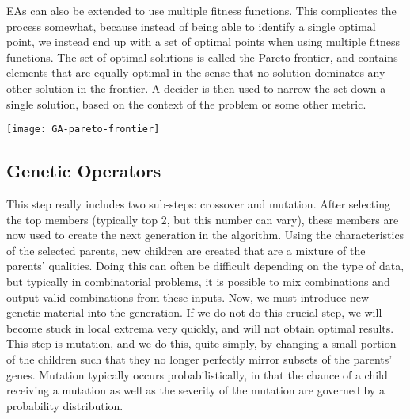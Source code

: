 EAs can also be extended to use multiple fitness functions. This complicates the process somewhat, because instead of being able to identify a single optimal point, we instead end up with a set of optimal points when using multiple fitness functions. The set of optimal solutions is called the Pareto frontier, and contains elements that are equally optimal in the sense that no solution dominates any other solution in the frontier. A decider is then used to narrow the set down a single solution, based on the context of the problem or some other metric.


\begin{marginfigure}
\texttt{[image: GA-pareto-frontier]}
\end{marginfigure}


\subsection{Genetic Operators}

This step really includes two sub-steps: crossover and mutation. After selecting the top members (typically top 2, but this number can vary), these members are now used to create the next generation in the algorithm. Using the characteristics of the selected parents, new children are created that are a mixture of the parents’ qualities. Doing this can often be difficult depending on the type of data, but typically in combinatorial problems, it is possible to mix combinations and output valid combinations from these inputs. Now, we must introduce new genetic material into the generation. If we do not do this crucial step, we will become stuck in local extrema very quickly, and will not obtain optimal results. This step is mutation, and we do this, quite simply, by changing a small portion of the children such that they no longer perfectly mirror subsets of the parents’ genes. Mutation typically occurs probabilistically, in that the chance of a child receiving a mutation as well as the severity of the mutation are governed by a probability distribution.


